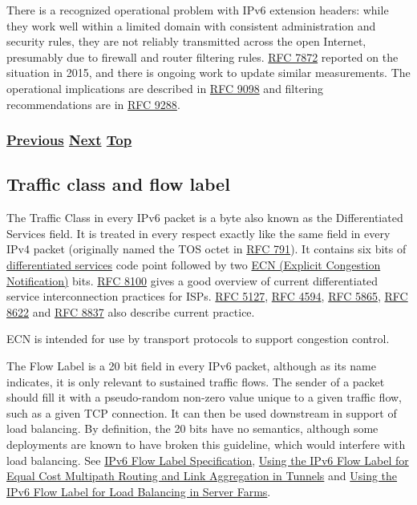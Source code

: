 \documentclass[
]{article}
\begin{document}
There is a recognized operational problem with IPv6 extension headers:
while they work well within a limited domain with consistent
administration and security rules, they are not reliably transmitted
across the open Internet, presumably due to firewall and router
filtering rules. \href{https://www.rfc-editor.org/info/rfc7872}{RFC
7872} reported on the situation in 2015, and there is ongoing work to
update similar measurements. The operational implications are described
in \href{https://www.rfc-editor.org/info/rfc9098}{RFC 9098} and
filtering recommendations are in
\href{https://www.rfc-editor.org/info/rfc9288}{RFC 9288}.

\subsubsection{\texorpdfstring{\hyperref[transport-protocols]{Previous}
\hyperref[traffic-class-and-flow-label]{Next}
\hyperref[ipv6-basic-technology]{Top}}{Previous Next Top}}\label{previous-next-top-16}

\pagebreak

\subsection{Traffic class and flow
label}\label{traffic-class-and-flow-label}

The Traffic Class in every IPv6 packet is a byte also known as the
Differentiated Services field. It is treated in every respect exactly
like the same field in every IPv4 packet (originally named the TOS octet
in \href{https://www.rfc-editor.org/info/rfc791}{RFC 791}). It contains
six bits of
\href{https://www.rfc-editor.org/info/rfc2474}{differentiated services}
code point followed by two
\href{https://www.rfc-editor.org/info/rfc3168}{ECN (Explicit Congestion
Notification)} bits. \href{https://www.rfc-editor.org/info/rfc8100}{RFC
8100} gives a good overview of current differentiated service
interconnection practices for ISPs.
\href{https://www.rfc-editor.org/info/rfc5127}{RFC 5127},
\href{https://www.rfc-editor.org/info/rfc4594}{RFC 4594},
\href{https://www.rfc-editor.org/info/rfc5865}{RFC 5865},
\href{https://www.rfc-editor.org/info/rfc8622}{RFC 8622} and
\href{https://www.rfc-editor.org/info/rfc8837}{RFC 8837} also describe
current practice.

ECN is intended for use by transport protocols to support congestion
control.

The Flow Label is a 20 bit field in every IPv6 packet, although as its
name indicates, it is only relevant to sustained traffic flows. The
sender of a packet should fill it with a pseudo-random non-zero value
unique to a given traffic flow, such as a given TCP connection. It can
then be used downstream in support of load balancing. By definition, the
20 bits have no semantics, although some deployments are known to have
broken this guideline, which would interfere with load balancing. See
\href{https://www.rfc-editor.org/info/rfc6437}{IPv6 Flow Label
Specification}, \href{https://www.rfc-editor.org/info/rfc6438}{Using the
IPv6 Flow Label for Equal Cost Multipath Routing and Link Aggregation in
Tunnels} and \href{https://www.rfc-editor.org/info/rfc7098}{Using the
IPv6 Flow Label for Load Balancing in Server Farms}.
\end{document}

